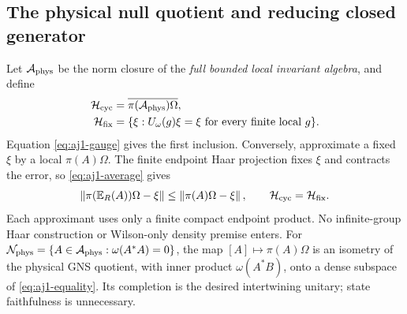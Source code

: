 \subsection{The physical null quotient and reducing closed generator}
Let $\mathcal A_{\rm phys}$ be the norm closure of the \emph{full bounded local invariant algebra}, and define
\begin{align}
 \mathcal H_{\rm cyc}&=\overline{\pi(\mathcal A_{\rm phys})\Omega},\notag\\
 \mathcal H_{\rm fix}&=\{\xi:U_\omega(g)\xi=\xi
                  \text{ for every finite local }g\}.
\end{align}
Equation \eqref{eq:aj1-gauge} gives the first inclusion. Conversely, approximate a fixed $\xi$ by a local $\pi(A)\Omega$. The finite endpoint Haar projection fixes $\xi$ and contracts the error, so \eqref{eq:aj1-average} gives
\begin{equation}
 \left\lVert\pi(\mathbb E_R(A))\Omega-\xi\right\rVert
 \le\left\lVert\pi(A)\Omega-\xi\right\rVert,
 \qquad \mathcal H_{\rm cyc}=\mathcal H_{\rm fix}.
 \label{eq:aj1-equality}
\end{equation}
Each approximant uses only a finite compact endpoint product. No infinite-group Haar construction or Wilson-only density premise enters. For $\mathcal N_{\rm phys}=\{A\in\mathcal A_{\rm phys}:\omega(A^*A)=0\}$, the map $[A]\mapsto\pi(A)\Omega$ is an isometry of the physical GNS quotient, with inner product $\omega(A^*B)$, onto a dense subspace of \eqref{eq:aj1-equality}. Its completion is the desired intertwining unitary; state faithfulness is unnecessary.

